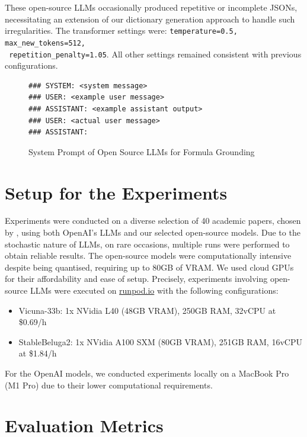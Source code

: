 These open-source LLMs occasionally produced repetitive or incomplete JSONs, necessitating an extension of our dictionary generation approach to handle such irregularities. The transformer settings were: \texttt{temperature=0.5, max\_new\_tokens=512,} \\ \texttt{ repetition\_penalty=1.05}. All other settings remained consistent with previous configurations.

\begin{figure}[htpb]
  \centering
  \begin{lstlisting}
### SYSTEM: <system message>
### USER: <example user message>
### ASSISTANT: <example assistant output>
### USER: <actual user message>
### ASSISTANT:
  \end{lstlisting}
  \caption[System Prompt for Annotation]{System Prompt of Open Source LLMs for Formula Grounding}\label{fig:open-source-prompt-structure}
\end{figure}

\section{Setup for the Experiments}

Experiments were conducted on a diverse selection of 40 academic papers, chosen by \citet{asakura2022building}, using both OpenAI's LLMs and our selected open-source models. Due to the stochastic nature of LLMs, on rare occasions, multiple runs were performed to obtain reliable results. The open-source models were computationally intensive despite being quantised, requiring up to 80GB of VRAM. We used cloud GPUs for their affordability and ease of setup. Precisely, experiments involving open-source LLMs were executed on \href{https://runpod.io}{runpod.io} with the following configurations:

\begin{itemize}
    \item Vicuna-33b: 1x NVidia L40 (48GB VRAM), 250GB RAM, 32vCPU at \$0.69/h
    \item StableBeluga2: 1x NVidia A100 SXM (80GB VRAM), 251GB RAM, 16vCPU at \$1.84/h
\end{itemize}

For the OpenAI models, we conducted experiments locally on a MacBook Pro (M1 Pro) due to their lower computational requirements.

\section{Evaluation Metrics}


